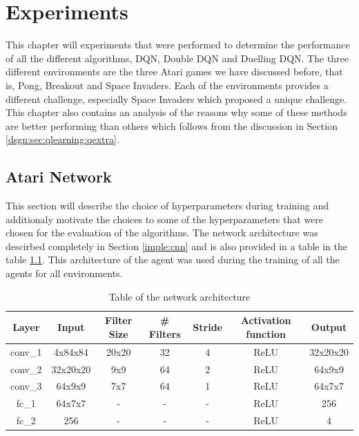 \chapter{Experiments}
This chapter will experiments that were performed to determine the performance of all the different algorithms, DQN, Double DQN and Duelling DQN. The three different environments are the three Atari games we have discussed before, that is, Pong, Breakout and Space Invaders. Each of the environments provides a different challenge, especially Space Invaders which proposed a unique challenge. This chapter also contains an analysis of the reasons why some of these methods are better performing than others which follows from the discussion in Section \ref{dsgn:sec:qlearning:qextra}.

\section{Atari Network}
This section will describe the choice of hyperparameters during training and additionaly motivate the choices to some of the hyperparameters that were chosen for the evaluation of the algorithms. The network architecture was descirbed completely in Section \ref{imple:cnn} and is also provided in a table in the table \ref{table:network-arch}. This architecture of the agent was used during the training of all the agents for all environments.

\begin{table}[htbp]
	\centering
	\begin{tabular}{|c|c|c|c|c|c|c|}
		\hline
		Layer   & Input    & Filter Size & \# Filters & Stride & Activation function & Output   \\ \hline
		conv\_1 & 4x84x84  & 20x20       & 32         & 4      & ReLU                & 32x20x20 \\
		conv\_2 & 32x20x20 & 9x9         & 64         & 2      & ReLU                & 64x9x9   \\
		conv\_3 & 64x9x9   & 7x7         & 64         & 1      & ReLU                & 64x7x7   \\
		fc\_1   & 64x7x7   & -           & -          & -      & ReLU                & 256      \\
		fc\_2   & 256      & -           & -          & -      & ReLU                & 4        \\ \hline
	\end{tabular}
	\caption{Table of the network architecture
		\label{table:network-arch}
	}
\end{table}

